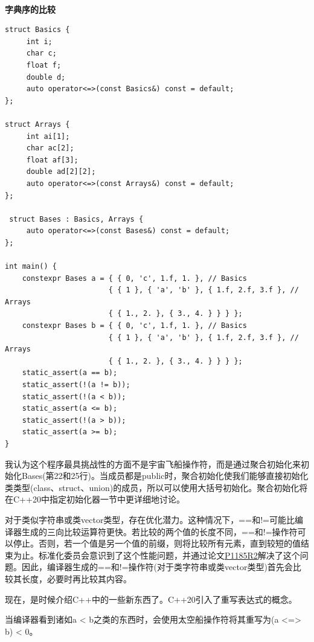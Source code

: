 \hspace*{\fill} \\ %
\noindent
\textbf{字典序的比较}
\begin{lstlisting}[style=styleCXX]
struct Basics {
	 int i;
	 char c;
	 float f;
	 double d;
	 auto operator<=>(const Basics&) const = default;
};

struct Arrays {
	 int ai[1];
	 char ac[2];
	 float af[3];
	 double ad[2][2];
	 auto operator<=>(const Arrays&) const = default;
};

 struct Bases : Basics, Arrays {
	 auto operator<=>(const Bases&) const = default;
};

int main() {
	constexpr Bases a = { { 0, 'c', 1.f, 1. }, // Basics
	 					{ { 1 }, { 'a', 'b' }, { 1.f, 2.f, 3.f }, // Arrays
						{ { 1., 2. }, { 3., 4. } } } };
	constexpr Bases b = { { 0, 'c', 1.f, 1. }, // Basics
	 					{ { 1 }, { 'a', 'b' }, { 1.f, 2.f, 3.f }, // Arrays
		 				{ { 1., 2. }, { 3., 4. } } } };
	static_assert(a == b);
	static_assert(!(a != b));
	static_assert(!(a < b));
	static_assert(a <= b);
	static_assert(!(a > b));
	static_assert(a >= b);
}
\end{lstlisting}

我认为这个程序最具挑战性的方面不是宇宙飞船操作符，而是通过聚合初始化来初始化Bases(第22和25行)。当成员都是public时，聚合初始化使我们能够直接初始化类类型(class、struct、union)的成员，所以可以使用大括号初始化。聚合初始化将在C++20中指定初始化器一节中更详细地讨论。

\begin{tcolorbox}[breakable,enhanced jigsaw,colback=blue!5!white,colframe=blue!75!black,title={优化的==和!=操作符}]

对于类似字符串或类vector类型，存在优化潜力。这种情况下，==和!=可能比编译器生成的三向比较运算符更快。若比较的两个值的长度不同，==和!=操作符可以停止。否则，若一个值是另一个值的前缀，则将比较所有元素，直到较短的值结束为止。标准化委员会意识到了这个性能问题，并通过论文\href{http://www.open-std.org/jtc1/sc22/wg21/docs/papers/2019/p1185r2.html}{P1185R2}解决了这个问题。因此，编译器生成的==和!=操作符(对于类字符串或类vector类型)首先会比较其长度，必要时再比较其内容。

\end{tcolorbox}

现在，是时候介绍C++中的一些新东西了。C++20引入了重写表达式的概念。


当编译器看到诸如a < b之类的东西时，会使用太空船操作符将其重写为(a <=> b) < 0。

